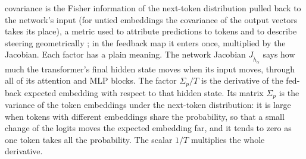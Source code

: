\documentclass[11pt,letterpaper]{article}
\begin{document}
covariance is the Fisher information of the next-token distribution pulled back to the network's input (for untied
embeddings the covariance of the output vectors takes its place), a metric used to attribute
predictions to tokens and to describe steering geometrically \cite{liu2026jacobianscopes,wang2026fishback}; in the
feedback map it enters once, multiplied by the Jacobian.
Each factor has a plain meaning. The network Jacobian $J_{\tilde h_\alpha}$ says how much the transformer's final
hidden state moves when its input moves, through all of its attention and MLP blocks. The factor $\Sigma_p/T$ is the
derivative of the fed-back expected embedding with respect to that hidden state. Its matrix $\Sigma_p$ is the variance
of the token embeddings under the next-token distribution: it is large when tokens with different embeddings share
the probability, so that a small change of the logits moves the expected embedding far, and it tends to zero as one
token takes all the probability. The scalar $1/T$ multiplies the whole derivative.
\end{document}
